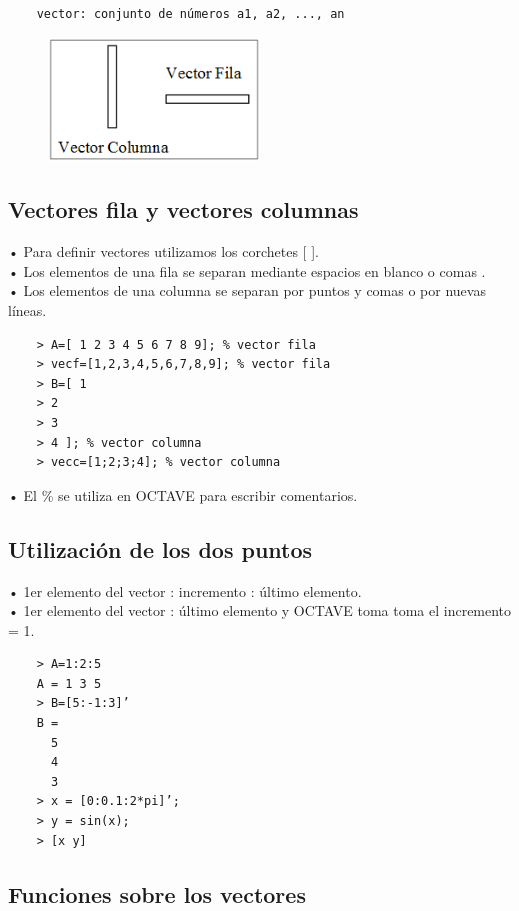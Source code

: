 \documentclass[a4,12pt]{article}
\begin{document}
\begin{verbatim}
    vector: conjunto de números a1, a2, ..., an
\end{verbatim}
\begin{figure}[H]
  \centering
    \includegraphics[width=0.5\textwidth]{graficos/imagen1}
\end{figure}

\subsection{Vectores fila y vectores columnas}

• Para definir vectores utilizamos los corchetes [ ].\\
• Los elementos de una fila se separan mediante espacios en blanco o comas .\\
• Los elementos de una columna se separan por puntos y comas o por nuevas líneas.\\
\begin{verbatim}
    > A=[ 1 2 3 4 5 6 7 8 9]; % vector fila
    > vecf=[1,2,3,4,5,6,7,8,9]; % vector fila
    > B=[ 1
    > 2
    > 3
    > 4 ]; % vector columna
    > vecc=[1;2;3;4]; % vector columna
\end{verbatim}
• El \% se utiliza en OCTAVE para escribir comentarios.

\subsection{Utilización de los dos puntos}

• 1er elemento del vector : incremento : último elemento.\\
• 1er elemento del vector : último elemento y OCTAVE toma toma el incremento = 1.\\
\begin{verbatim}
    > A=1:2:5
    A = 1 3 5
    > B=[5:-1:3]’
    B =
      5
      4
      3
    > x = [0:0.1:2*pi]’;
    > y = sin(x);
    > [x y]
\end{verbatim}

\subsection{Funciones sobre los vectores}
\end{document}
